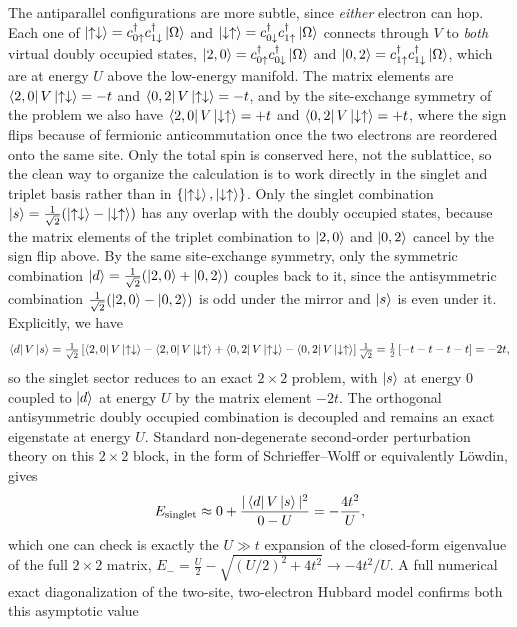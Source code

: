 \documentclass[lecture_notes.tex]{subfiles}
\begin{document}
The antiparallel configurations are more subtle, since \emph{either} electron can hop. Each one
of $\ket{\uparrow\downarrow} = c^{\dagger}_{0\uparrow}c^{\dagger}_{1\downarrow}\ket{\Omega}$ and $\ket{\downarrow\uparrow} = c^{\dagger}_{0\downarrow}c^{\dagger}_{1\uparrow}\ket{\Omega}$ connects
through $V$ to \emph{both} virtual doubly occupied states, $\ket{2,0} = c^{\dagger}_{0\uparrow}c^{\dagger}_{0\downarrow}\ket{\Omega}$
and $\ket{0,2} = c^{\dagger}_{1\uparrow}c^{\dagger}_{1\downarrow}\ket{\Omega}$, which are at energy $U$ above the low-energy
manifold. The matrix elements are $\bra{2,0}V\ket{\uparrow\downarrow} = -t$ and $\bra{0,2}V\ket{\uparrow\downarrow}=-t$,
and by the site-exchange symmetry of the problem we also have $\bra{2,0}V\ket{\downarrow\uparrow} = +t$ and
$\bra{0,2}V\ket{\downarrow\uparrow}=+t$, where the sign flips because of fermionic anticommutation once the
two electrons are reordered onto the same site. Only the total spin is conserved here, not the
sublattice, so the clean way to organize the calculation is to work directly in the singlet and
triplet basis rather than in $\{\ket{\uparrow\downarrow},\ket{\downarrow\uparrow}\}$. Only the singlet combination
$\ket{s}=\tfrac1{\sqrt2}(\ket{\uparrow\downarrow}-\ket{\downarrow\uparrow})$ has any overlap with the doubly occupied
states, because the matrix elements of the triplet combination to $\ket{2,0}$ and $\ket{0,2}$
cancel by the sign flip above. By the same site-exchange symmetry, only the symmetric combination
$\ket{d}=\tfrac1{\sqrt2}(\ket{2,0}+\ket{0,2})$ couples back to it, since the antisymmetric
combination $\tfrac1{\sqrt2}(\ket{2,0}-\ket{0,2})$ is odd under the mirror and $\ket s$ is even
under it. Explicitly, we have
\begin{equation}
  \bra{d}V\ket{s} = \tfrac1{\sqrt2}\left[\bra{2,0}V\ket{\uparrow\downarrow}-\bra{2,0}V\ket{\downarrow\uparrow}
    +\bra{0,2}V\ket{\uparrow\downarrow}-\bra{0,2}V\ket{\downarrow\uparrow}\right]\tfrac1{\sqrt2}
  = \tfrac12\left[-t-t-t-t\right] = -2t,
\end{equation}
so the singlet sector reduces to an exact $2\times2$ problem, with $\ket s$ at energy $0$ coupled
to $\ket d$ at energy $U$ by the matrix element $-2t$. The orthogonal antisymmetric doubly
occupied combination is decoupled and remains an exact eigenstate at energy $U$. Standard
non-degenerate second-order perturbation theory on this $2\times2$ block, in the form of
Schrieffer--Wolff or equivalently L\"owdin, gives
\begin{equation}
  E_{\mathrm{singlet}} \approx 0 + \frac{|\bra{d}V\ket s|^2}{0-U} = -\frac{4t^2}{U},
\end{equation}
which one can check is exactly the $U\gg t$ expansion of the closed-form eigenvalue of the full
$2\times2$ matrix, $E_-=\tfrac U2-\sqrt{(U/2)^2+4t^2}\to-4t^2/U$. A full numerical exact
diagonalization of the two-site, two-electron Hubbard model confirms both this asymptotic value
\end{document}
